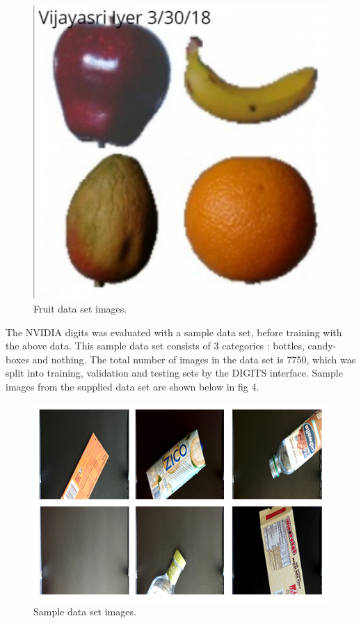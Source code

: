 \documentclass[10pt,journal,compsoc]{IEEEtran}
\begin{document}
\begin{figure}[thpb]
      \centering
      \includegraphics[width=\linewidth]{col.png}
      \caption{Fruit data set images.}
      \label{fig:robot1}
\end{figure}

The NVIDIA digits was evaluated with a sample data set, before training with the above data. This sample data set consists of 3 categories : bottles, candy-boxes and nothing. The total number of images in the data set is 7750, which was split into training, validation and testing sets by the DIGITS interface. Sample images from the supplied data set are shown below in fig 4.

\begin{figure}[tbhp]
      \centering
      \includegraphics[width=\linewidth]{data.jpg}
      \caption{Sample data set images.}
      \label{fig:robot1}
\end{figure}
\end{document}
